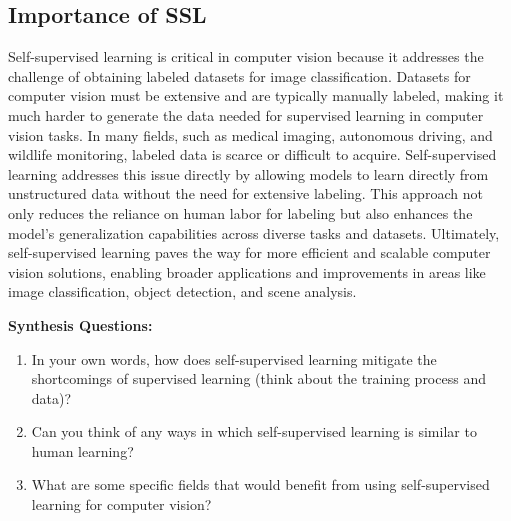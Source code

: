\subsection{Importance of SSL}
\begin{flushleft}
    \large Self-supervised learning is critical in computer vision because it addresses the challenge of obtaining labeled datasets for image classification. Datasets for computer vision must be extensive and are typically manually labeled, making it much harder to generate the data needed for supervised learning in computer vision tasks. In many fields, such as medical imaging, autonomous driving, and wildlife monitoring, labeled data is scarce or difficult to acquire. Self-supervised learning addresses this issue directly by allowing models to learn directly from unstructured data without the need for extensive labeling. This approach not only reduces the reliance on human labor for labeling but also enhances the model's generalization capabilities across diverse tasks and datasets. Ultimately, self-supervised learning paves the way for more efficient and scalable computer vision solutions, enabling broader applications and improvements in areas like image classification, object detection, and scene analysis.
\end{flushleft}

\vspace{10px}
\begin{questionbox}
    \textbf{Synthesis Questions:}
    \begin{enumerate}    
        \item In your own words, how does self-supervised learning mitigate the shortcomings of supervised learning (think about the training process and data)?
        \item Can you think of any ways in which self-supervised learning is similar to human learning?
        \item What are some specific fields that would benefit from using self-supervised learning for computer vision?
    \end{enumerate}
    \vspace{1px}
\end{questionbox}

